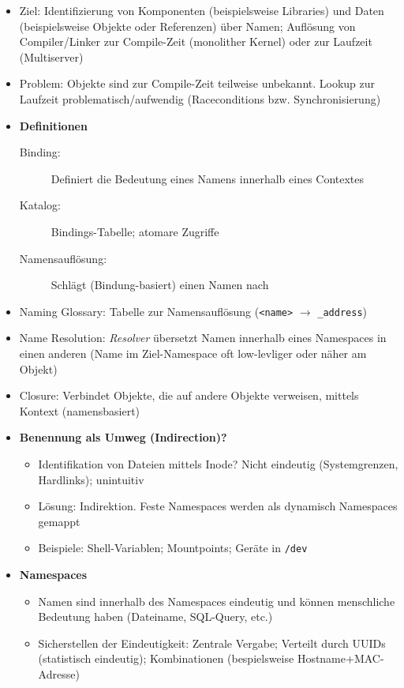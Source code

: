 \begin{itemize}
	\item Ziel: Identifizierung von Komponenten (beispielsweise Libraries) und Daten (beispielsweise Objekte oder Referenzen) über Namen; Auflösung von Compiler/Linker zur Compile-Zeit (monolither Kernel) oder zur Laufzeit (Multiserver)
	\item Problem: Objekte sind zur Compile-Zeit teilweise unbekannt. Lookup zur Laufzeit problematisch/aufwendig (Raceconditions bzw. Synchronisierung)
	\item \textbf{Definitionen}
	\begin{description}
		\item[Binding:] Definiert die Bedeutung eines Namens innerhalb eines Contextes
		\item[Katalog:] Bindings-Tabelle; atomare Zugriffe
		\item[Namensauflösung:] Schlägt (Bindung-basiert) einen Namen nach
	\end{description}
	\item Naming Glossary: Tabelle zur Namensauflösung (\texttt{<name>} \(\rightarrow\) \texttt{\_address})
	\item Name Resolution: \textit{Resolver} übersetzt Namen innerhalb eines Namespaces in einen anderen (Name im Ziel-Namespace oft low-levliger oder näher am Objekt)
	\item Closure: Verbindet Objekte, die auf andere Objekte verweisen, mittels Kontext (namensbasiert)
	\item \textbf{Benennung als Umweg (Indirection)?}
	\begin{itemize}
		\item Identifikation von Dateien mittels Inode? Nicht eindeutig (Systemgrenzen, Hardlinks); unintuitiv
		\item Lösung: Indirektion. Feste Namespaces werden als dynamisch Namespaces gemappt
		\item Beispiele: Shell-Variablen; Mountpoints; Geräte in \texttt{/dev}
	\end{itemize}
	\item \textbf{Namespaces}
	\begin{itemize}
		\item Namen sind innerhalb des Namespaces eindeutig und können menschliche Bedeutung haben (Dateiname, SQL-Query, etc.)
		\item Sicherstellen der Eindeutigkeit: Zentrale Vergabe; Verteilt durch UUIDs (statistisch eindeutig); Kombinationen (bespielsweise Hostname+MAC-Adresse)
	\end{itemize}

\end{itemize}
